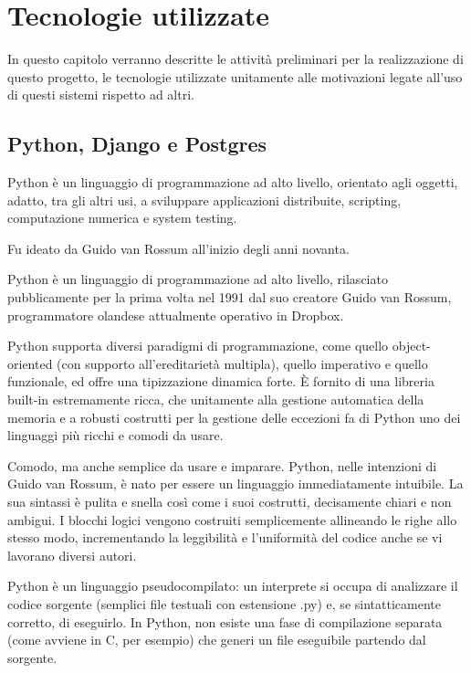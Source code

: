 \chapter{Tecnologie utilizzate}
In questo capitolo verranno descritte le attività preliminari per la realizzazione di questo progetto, le tecnologie utilizzate
unitamente alle motivazioni legate all'uso di questi sistemi rispetto ad altri.


\section{Python, Django e Postgres}
Python è un linguaggio di programmazione ad alto livello, orientato agli oggetti, adatto, tra gli altri usi, a sviluppare applicazioni 
distribuite, scripting, computazione numerica e system testing.

Fu ideato da Guido van Rossum all'inizio degli anni novanta.

Python è un linguaggio di programmazione ad alto livello, rilasciato pubblicamente per la prima volta nel 1991 dal suo creatore 
Guido van Rossum, programmatore olandese attualmente operativo in Dropbox.

Python supporta diversi paradigmi di programmazione, come quello object-oriented (con supporto all'ereditarietà multipla), quello 
imperativo e quello funzionale, ed offre una tipizzazione dinamica forte. È fornito di una libreria built-in estremamente ricca, che 
unitamente alla gestione automatica della memoria e a robusti costrutti per la gestione delle eccezioni fa di Python uno dei linguaggi 
più ricchi e comodi da usare.

Comodo, ma anche semplice da usare e imparare. Python, nelle intenzioni di Guido van Rossum, è nato per essere un linguaggio 
immediatamente intuibile. La sua sintassi è pulita e snella così come i suoi costrutti, decisamente chiari e non ambigui. I blocchi 
logici vengono costruiti semplicemente allineando le righe allo stesso modo, incrementando la leggibilità e l'uniformità del codice 
anche se vi lavorano diversi autori.

Python è un linguaggio pseudocompilato: un interprete si occupa di analizzare il codice sorgente (semplici file testuali con 
estensione .py) e, se sintatticamente corretto, di eseguirlo. In Python, non esiste una fase di compilazione separata (come 
avviene in C, per esempio) che generi un file eseguibile partendo dal sorgente.


